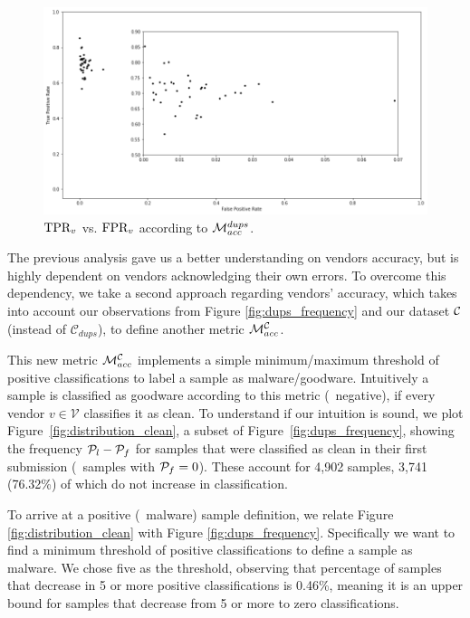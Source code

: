 \begin{figure}[!htb]
	\centering
	\includegraphics[width=\textwidth]{Figures/dr_fpr_own.png}
	\caption{$\textrm{TPR}_v$ vs. $\textrm{FPR}_v$ according to $\mathcal{M}_{acc}^{{dups}}$.}
	\label{fig:dr_fpr_own}
\end{figure}

The previous analysis gave us a better understanding on vendors accuracy, but is highly dependent on vendors acknowledging their own errors.
To overcome this dependency, we take a second approach regarding vendors' accuracy, which takes into account our observations from Figure \ref{fig:dups_frequency} and our dataset $\mathcal{C}$ (instead of $\mathcal{C}_{dups}$), to define another metric $\mathcal{M}_{acc}^{\mathcal{C}}$.

This new metric $\mathcal{M}_{acc}^{\mathcal{C}}$ implements a simple minimum/maximum threshold of positive classifications to label a sample as malware/goodware.
Intuitively a sample is classified as goodware according to this metric (\ie\  negative), if every vendor $v\in\mathcal{V}$ classifies it as clean.
To understand if our intuition is sound, we plot Figure~\ref{fig:distribution_clean}, a subset of Figure~\ref{fig:dups_frequency}, showing the frequency $\mathcal{P}_{l}-\mathcal{P}_{f}$ for samples that were classified as clean in their first submission (\ie\ samples with $\mathcal{P}_{f}=0$).
These account for 4,902 samples, 3,741 (76.32\%) of which do not increase in classification.

To arrive at a positive (\ie\ malware) sample definition, we relate Figure \ref{fig:distribution_clean} with Figure \ref{fig:dups_frequency}.
Specifically we want to find a minimum threshold of positive classifications to define a sample as malware.
We chose five as the threshold, observing that percentage of samples that decrease in 5 or more positive classifications is 0.46\%, meaning it is an upper bound for samples that decrease from 5 or more to zero classifications.

